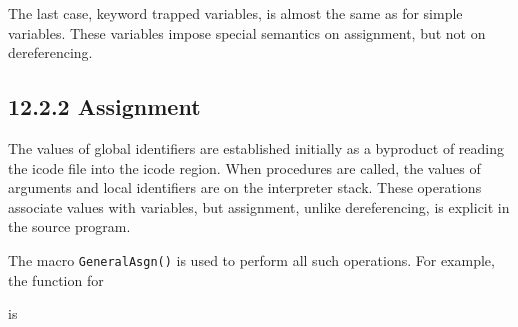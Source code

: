 The last case, keyword trapped variables, is almost the same as for
simple variables. These variables impose special semantics on
assignment, but not on dereferencing.

\goodbreak
{}

\subsection[12.2.2 Assignment]{12.2.2 Assignment}

The values of global identifiers are established initially as a
byproduct of reading the icode file into the icode region. When
procedures are called, the values of arguments and local identifiers
are on the interpreter stack. These operations associate values with
variables, but assignment, unlike dereferencing, is explicit in the
source program.


The macro \texttt{GeneralAsgn()} is used to perform all such
operations. For example, the function for


is

